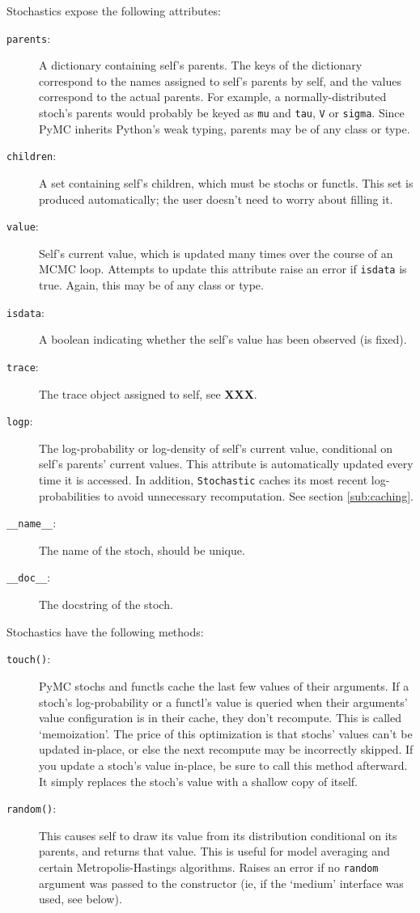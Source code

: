 \documentclass[]{book}
\begin{document}
Stochastics expose the following attributes:
\begin{description}
    \item[\texttt{parents}:] A dictionary containing self's parents. The keys of the dictionary correspond to the names assigned to self's parents by self, and the values correspond to the actual parents. For example, a normally-distributed stoch's parents would probably be keyed as \texttt{mu} and \texttt{tau}, \texttt{V} or \texttt{sigma}. Since PyMC inherits Python's weak typing, parents may be of any class or type.
    \item[\texttt{children}:] A set containing self's children, which must be stochs or functls. This set is produced automatically; the user doesn't need to worry about filling it.
    \item[\texttt{value}:] Self's current value, which is updated many times over the course of an MCMC loop. Attempts to update this attribute raise an error if \texttt{isdata} is true. Again, this may be of any class or type.
    \item[\texttt{isdata}:] A boolean indicating whether the self's value has been observed (is fixed).
    \item[\texttt{trace}:] The trace object assigned to self, see \textbf{XXX}.
    \item[\texttt{logp}:] The log-probability or log-density of self's current value, conditional on self's parents' current values. This attribute is automatically updated every time it is accessed. In addition, \texttt{Stochastic} caches its most recent log-probabilities to avoid unnecessary recomputation. See section \ref{sub:caching}.
    \item[\texttt{\_\_name\_\_}:] The name of the stoch, should be unique.
    \item[\texttt{\_\_doc\_\_}:] The docstring of the stoch.
\end{description}

Stochastics have the following methods:
\begin{description}
	\item[\texttt{touch()}:] PyMC stochs and functls cache the last few values of their arguments. If a stoch's log-probability or a functl's value is queried when their arguments' value configuration is in their cache, they don't recompute. This is called `memoization'. The price of this optimization is that stochs' values can't be updated in-place, or else the next recompute may be incorrectly skipped. If you update a stoch's value in-place, be sure to call this method afterward. It simply replaces the stoch's value with a shallow copy of itself.
    \item[\texttt{random()}:] This causes self to draw its value from its distribution conditional on its parents, and returns that value. This is useful for model averaging and certain Metropolis-Hastings algorithms. Raises an error if no \texttt{random} argument was passed to the constructor (ie, if the `medium' interface was used, see below).
\end{description}
\end{document}
